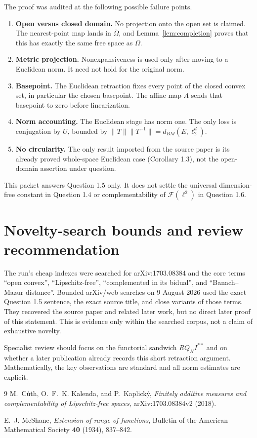 \documentclass[11pt]{article}
\newcommand{\F}{\mathcal F}
\begin{document}
The proof was audited at the following possible failure points.
\begin{enumerate}
\item \textbf{Open versus closed domain.}  No projection onto the open set is
claimed.  The nearest-point map lands in $\overline\Omega$, and
Lemma~\ref{lem:completion} proves that this has exactly the same free space as
$\Omega$.
\item \textbf{Metric projection.}  Nonexpansiveness is used only after moving
to a Euclidean norm.  It need not hold for the original norm.
\item \textbf{Basepoint.}  The Euclidean retraction fixes every point of the
closed convex set, in particular the chosen basepoint.  The affine map $A$
sends that basepoint to zero before linearization.
\item \textbf{Norm accounting.}  The Euclidean stage has norm one.  The only
loss is conjugation by $U$, bounded by
$\|T\|\|T^{-1}\|=d_{BM}(E,\ell_2^d)$.
\item \textbf{No circularity.}  The only result imported from the source
paper is its already proved whole-space Euclidean case (Corollary 1.3), not
the open-domain assertion under question.
\end{enumerate}

This packet answers Question 1.5 only.  It does not settle the universal
dimension-free constant in Question 1.4 or complementability of
$\F(\ell^2)$ in Question 1.6.

\section{Novelty-search bounds and review recommendation}

The run's cheap indexes were searched for arXiv:1703.08384 and the core terms
``open convex'', ``Lipschitz-free'', ``complemented in its bidual'', and
``Banach--Mazur distance''.  Bounded arXiv/web searches on 9 August 2026 used
the exact Question 1.5 sentence, the exact source title, and close variants of
those terms.  They recovered the source paper and related later work, but no
direct later proof of this statement.  This is evidence only within the
searched corpus, not a claim of exhaustive novelty.

Specialist review should focus on the functorial sandwich
$RQ_HI^{**}$ and on whether a later publication already records this short
retraction argument.  Mathematically, the key observations are standard and
all norm estimates are explicit.

\begin{thebibliography}{9}
M.~C\'uth, O.~F.~K. Kalenda, and P.~Kaplick\'y,
\emph{Finitely additive measures and complementability of Lipschitz-free
spaces}, arXiv:1703.08384v2 (2018).

E.~J. McShane,
\emph{Extension of range of functions},
Bulletin of the American Mathematical Society \textbf{40} (1934), 837--842.
\end{thebibliography}
\end{document}
